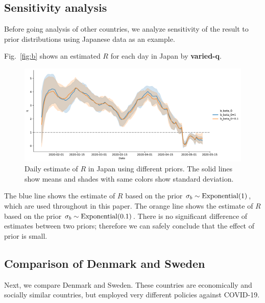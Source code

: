\documentclass{amsart}
\begin{document}
\subsection{Sensitivity analysis}

Before going analysis of other countries, we analyze sensitivity of the result to prior distributions using Japanese data as an example.

Fig.~\ref{fig:b} shows an estimated $R$ for each day in Japan by \textbf{varied-q}.
\begin{figure}[h]
 \centering
 \includegraphics[width=\linewidth]{fig/Sensitivity.pdf}
 \caption{Daily estimate of $R$ in Japan using different priors. The solid lines show means and shades with same colors show standard deviation.}
 \label{fig:sensitivity}
\end{figure}
The blue line shows the estimate of $R$ based on the prior $\sigma_b \sim \textup{Exponential}(1)$, which are used throughout in this paper.
The orange line shows the estimate of $R$ based on the prior $\sigma_b \sim \textup{Exponential}(0.1)$.
There is no significant difference of estimates between two priors; therefore we can safely conclude that the effect of prior is small.

\subsection{Comparison of Denmark and Sweden}

Next, we compare Denmark and Sweden.
These countries are economically and socially similar countries, but employed very different policies against COVID-19.
\end{document}
